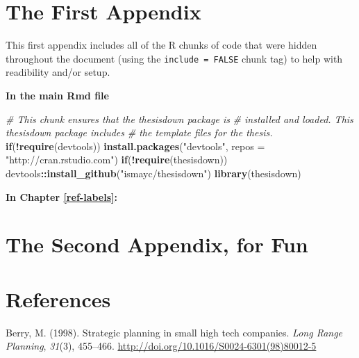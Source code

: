 \documentclass[12pt,twoside]{reedthesis}
\newenvironment{Shaded}{\begin{snugshade}}{\end{snugshade}}
\newcommand{\CommentTok}[1]{\textcolor[rgb]{0.56,0.35,0.01}{\textit{#1}}}
\newcommand{\ControlFlowTok}[1]{\textcolor[rgb]{0.13,0.29,0.53}{\textbf{#1}}}
\newcommand{\DataTypeTok}[1]{\textcolor[rgb]{0.13,0.29,0.53}{#1}}
\newcommand{\KeywordTok}[1]{\textcolor[rgb]{0.13,0.29,0.53}{\textbf{#1}}}
\newcommand{\NormalTok}[1]{#1}
\newcommand{\OperatorTok}[1]{\textcolor[rgb]{0.81,0.36,0.00}{\textbf{#1}}}
\newcommand{\StringTok}[1]{\textcolor[rgb]{0.31,0.60,0.02}{#1}}
\begin{document}
\appendix

\hypertarget{the-first-appendix}{%
\chapter{The First Appendix}\label{the-first-appendix}}

This first appendix includes all of the R chunks of code that were hidden throughout the document (using the \texttt{include\ =\ FALSE} chunk tag) to help with readibility and/or setup.

\textbf{In the main Rmd file}
\begin{Shaded}
\begin{Highlighting}[]
\CommentTok{# This chunk ensures that the thesisdown package is}
\CommentTok{# installed and loaded. This thesisdown package includes}
\CommentTok{# the template files for the thesis.}
\ControlFlowTok{if}\NormalTok{(}\OperatorTok{!}\KeywordTok{require}\NormalTok{(devtools))}
  \KeywordTok{install.packages}\NormalTok{(}\StringTok{"devtools"}\NormalTok{, }\DataTypeTok{repos =} \StringTok{"http://cran.rstudio.com"}\NormalTok{)}
\ControlFlowTok{if}\NormalTok{(}\OperatorTok{!}\KeywordTok{require}\NormalTok{(thesisdown))}
\NormalTok{  devtools}\OperatorTok{::}\KeywordTok{install_github}\NormalTok{(}\StringTok{"ismayc/thesisdown"}\NormalTok{)}
\KeywordTok{library}\NormalTok{(thesisdown)}
\end{Highlighting}
\end{Shaded}
\textbf{In Chapter \ref{ref-labels}:}

\hypertarget{the-second-appendix-for-fun}{%
\chapter{The Second Appendix, for Fun}\label{the-second-appendix-for-fun}}

\backmatter

\hypertarget{references}{%
\chapter*{References}\label{references}}


\noindent

\setlength{\parindent}{-0.20in}
\setlength{\leftskip}{0.20in}
\setlength{\parskip}{8pt}

\hypertarget{refs}{}
\leavevmode\hypertarget{ref-berryStrategicPlanningSmall1998}{}%
Berry, M. (1998). Strategic planning in small high tech companies. \emph{Long Range Planning}, \emph{31}(3), 455--466. \url{http://doi.org/10.1016/S0024-6301(98)80012-5}
\end{document}
